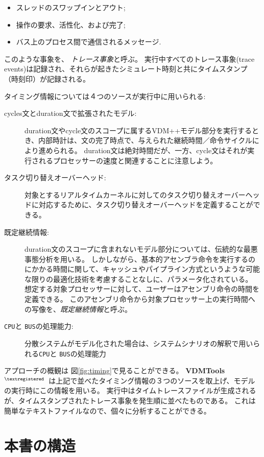 \documentclass[\pformat,12pt]{jreport}
\newcommand{\vdmtools}{\textbf{VDMTools}$^{\mathbf{{\textregistered}}}$}
\begin{document}
\begin{itemize}
\item スレッドのスワップインとアウト;
\item 操作の要求、活性化、および完了;
\item バス上のプロセス間で通信されるメッセージ.
\end{itemize}

このような事象を、 \emph{トレース事象}と呼ぶ。 
実行中すべてのトレース事象(trace events)は記録され、それらが起きたシミュレート時刻と共にタイムスタンプ（時刻印）が記録される。

タイミング情報については４つのソースが実行中に用いられる:

\begin{description}
\item[cycles文とduration文で拡張されたモデル:] duration文やcycle文のスコープに属するVDM++モデル部分を実行するとき、内部時計は、文の完了時点で、与えられた継続時間／命令サイクルにより進められる。
duration文は絶対時間だが、一方、cycle文はそれが実行されるプロセッサーの速度と関連することに注意しよう。
\item[タスク切り替えオーバーヘッド:] 対象とするリアルタイムカーネルに対してのタスク切り替えオーバーヘッドに対応するために、タスク切り替えオーバーヘッドを定義することができる。
\item[既定継続情報:] duration文のスコープに含まれないモデル部分については、伝統的な最悪事態分析を用いる。
しかしながら、基本的アセンブラ命令を実行するのにかかる時間に関して、キャッシュやパイプライン方式というような可能な限りの最適化技術を考慮することなしに、パラメータ化されている。
想定する対象プロセッサーに対して、ユーザーはアセンブリ命令の時間を定義できる。
このアセンブリ命令から対象プロセッサー上の実行時間への写像を、\emph{既定継続情報}と呼ぶ。
\item[\texttt{CPU}と \texttt{BUS}の処理能力:] 分散システムがモデル化された場合は、システムシナリオの解釈で用いられる\texttt{CPU}と \texttt{BUS}の処理能力
\end{description}

アプローチの概観は 図\ref{fig:timing}で見ることができる。 
\vdmtools\ は上記で並べたタイミング情報の３つのソースを取上げ、モデルの実行時にこの情報を用いる。
実行中はタイムトレースファイルが生成されるが、タイムスタンプされたトレース事象を発生順に並べたものである。
これは簡単なテキストファイルなので、個々に分析することができる。

\section{本書の構造}
\end{document}
